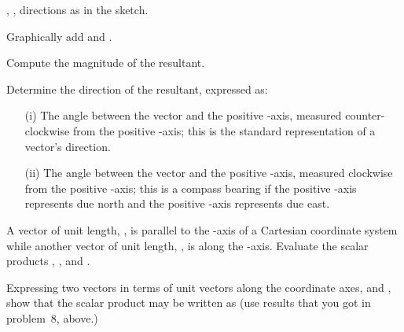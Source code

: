 {\begin{one-digit-list}
\item [6.] 
, , directions as in the sketch.
\begin{one-digit-list}
\item [a.] Graphically add  and .
\item [b.] Compute the magnitude of the resultant.
\item [c.] Determine the direction of the resultant, expressed as:
%
\begin{itemize}
\item [(i)] The angle between the vector and the positive -axis, measured
counter-clockwise from the  positive -axis; this is the standard
representation of a vector's direction.
\item [(ii)] The angle between the vector and the positive -axis, measured
clockwise from the positive -axis; this is a compass bearing if the positive
-axis represents due north and the positive -axis represents due east.
\end{itemize}
\end{one-digit-list}

\item [7.] 

\item [8.] A vector of unit length, , is parallel to the -axis of a
Cartesian coordinate system while another vector of unit length, , is
along the -axis.
Evaluate the scalar products , ,
and .

\item [9.] Expressing two vectors in terms of unit vectors along the coordinate
axes,  and , show that the scalar product may be
written as  (use results that you got in
problem~8, above.)


\end{one-digit-list}}
